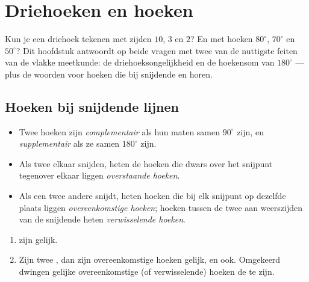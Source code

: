 \chapter{Driehoeken en hoeken}\label{ch:g7:triangles}

Kun je een driehoek tekenen met zijden $10$, $3$ en $2$? En met hoeken
$80^\circ$, $70^\circ$ en $50^\circ$? Dit hoofdstuk antwoordt op beide vragen met
twee van de nuttigste feiten van de vlakke meetkunde: de driehoeksongelijkheid en de
hoekensom van $180^\circ$ --- plus de woorden voor hoeken die bij snijdende en
 horen.

\section{Hoeken bij snijdende lijnen}

\begin{definition}\label{def:g7:triangles:pairs}
\begin{itemize}
  \item Twee hoeken zijn \emph{complementair} als hun maten samen $90^\circ$ zijn,
        en \emph{supplementair} als ze samen $180^\circ$ zijn.
  \item Als twee  elkaar snijden, heten de hoeken die dwars over het snijpunt
        tegenover elkaar liggen \emph{overstaande
        hoeken}.
  \item Als een  twee andere  snijdt, heten hoeken die bij elk snijpunt
        op dezelfde plaats liggen \emph{overeenkomstige hoeken}; hoeken tussen de
        twee  aan weerszijden van de snijdende  heten
        \emph{verwisselende hoeken}.
\end{itemize}
\end{definition}

\begin{theorem}\label{thm:g7:triangles:equalities}
\begin{enumerate}
  \item {} zijn gelijk.
  \item Zijn twee  , dan zijn overeenkomstige hoeken gelijk, en
         ook. Omgekeerd dwingen gelijke overeenkomstige (of
        verwisselende) hoeken de   te zijn.
\end{enumerate}
\end{theorem}

